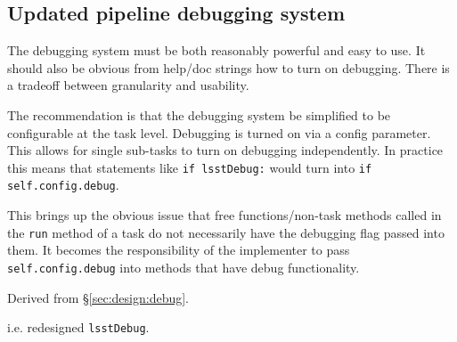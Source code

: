\subsection{Updated pipeline debugging system}


The debugging system must be both reasonably powerful and easy to use.
It should also be obvious from help/doc strings how to turn on debugging.
There is a tradeoff between granularity and usability.

The recommendation is that the debugging system be simplified to be configurable at the task level.
Debugging is turned on via a config parameter.
This allows for single sub-tasks to turn on debugging independently.
In practice this means that statements like \texttt{if lsstDebug:} would turn into \texttt{if self.config.debug}.

This brings up the obvious issue that free functions/non-task methods called in the \texttt{run} method of a task do not necessarily have the debugging flag passed into them.
It becomes the responsibility of the implementer to pass \texttt{self.config.debug} into methods that have debug functionality.

Derived from \S\ref{sec:design:debug}.

i.e. redesigned \texttt{lsstDebug}.
